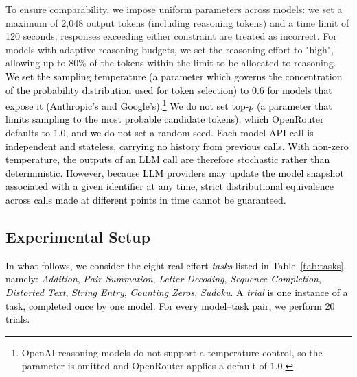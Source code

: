 \documentclass[12pt,a4paper]{article}
\newcommand{\blue}[1]{\textcolor{blue}{#1}}
\begin{document}
To ensure comparability, we impose uniform parameters across models: we set a maximum of 2,048 output tokens (including reasoning tokens) and a time limit of 120 seconds; responses exceeding either constraint are treated as incorrect. For models with adaptive reasoning budgets, we set the reasoning effort to "high", allowing up to 80\% of the tokens
within the limit to be allocated to reasoning. \textcolor{black}{We set the sampling temperature (a parameter which governs the concentration of the probability distribution used for token selection) to $0.6$ for models that expose it (Anthropic's and Google's).\footnote{OpenAI reasoning models do not support a temperature control, so the parameter is omitted and OpenRouter applies a default of $1.0$.} We do not set top-$p$ (a parameter that limits sampling to the most probable candidate tokens), which OpenRouter defaults to $1.0$, and we do not set a random seed.
Each model API call is independent and stateless, carrying no history from
previous calls. With non-zero temperature, the outputs of an LLM call are therefore stochastic rather than deterministic. However, because LLM providers may update the model snapshot associated with a given identifier at any time, strict distributional equivalence across calls made at different points in time cannot be guaranteed.}



\subsection{Experimental Setup}\label{subsec:setup}
\textcolor{black}{In what follows, we consider the eight real-effort \emph{tasks} listed in Table~\ref{tab:tasks}, namely: \emph{Addition}, {\em Pair Summation}, {\em Letter Decoding}, {\em Sequence Completion}, {\em Distorted Text}, {\em String Entry}, {\em Counting Zeros}, {\em Sudoku}. A \emph{trial} is one instance of a task, completed once by one model. For every model--task pair, we perform 20 trials.}
\end{document}
